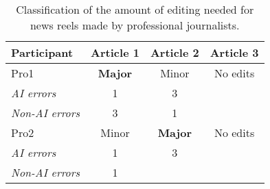 \begin{table}
\centering
\begin{adjustbox}{width=0.4\textwidth}
\begin{tabular}{|l|c|c|c|} 
\hline
\textbf{Participant} & \textbf{Article 1} & \textbf{Article 2} & \textbf{Article 3} \\
\hline
Pro1 & \color{red}\textbf{Major}\color{black}  & Minor & \color{teal}No edits\color{black}\\
\hline
\textit{AI errors} & 1 & 3 &  \\
\textit{Non-AI errors} & 3 & 1 &  \\
\hline
Pro2 & Minor & \color{red}\textbf{Major}\color{black}  & \color{teal}No edits\color{black} \\
\hline
\textit{AI errors} & 1 & 3 &  \\
\textit{Non-AI errors} & 1 &  &  \\
\hline
\end{tabular}
\end{adjustbox}
\caption{Classification of the amount of editing needed for news reels made by professional journalists.}
\label{pro_learning}
\end{table}

